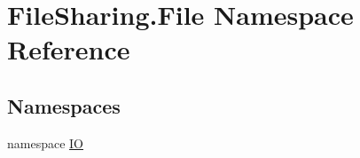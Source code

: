 \hypertarget{namespace_file_sharing_1_1_file}{}\section{File\+Sharing.\+File Namespace Reference}
\label{namespace_file_sharing_1_1_file}
\subsection*{Namespaces}
\begin{DoxyCompactItemize}
\item 
namespace \hyperlink{namespace_file_sharing_1_1_file_1_1_i_o}{IO}
\end{DoxyCompactItemize}
